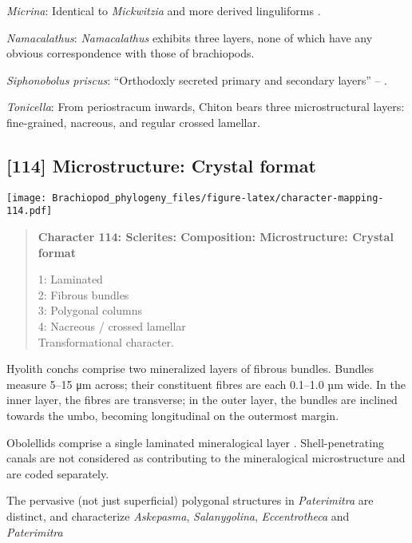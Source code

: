 \documentclass[openany]{book}
\theoremstyle{definition}
\theoremstyle{definition}
\theoremstyle{definition}
\theoremstyle{remark}
\begin{document}
\hypertarget{Micrina-coding-113}{}
\emph{Micrina}: Identical to \emph{Mickwitzia} and more derived
linguliforms \citep{Holmer2011Firstrecord}.

\hypertarget{Namacalathus-coding-113}{}
\emph{Namacalathus}: \emph{Namacalathus} exhibits three layers, none of
which have any obvious correspondence with those of brachiopods.

\hypertarget{Siphonobolus_priscus-coding-113}{}
\emph{Siphonobolus priscus}: ``Orthodoxly secreted primary and secondary
layers'' -- \citet{Williams2004Chemicostructure}.

\hypertarget{Tonicella-coding-113}{}
\emph{Tonicella}: From periostracum inwards, Chiton bears three
microstructural layers: fine-grained, nacreous, and regular crossed
lamellar.

\subsection*{{[}114{]} Microstructure: Crystal
format}\label{microstructure-crystal-format}

\texttt{[image: Brachiopod\_phylogeny\_files/figure-latex/character-mapping-114.pdf]}

\begin{quote}
\textbf{Character 114: Sclerites: Composition: Microstructure: Crystal
format}

1: Laminated\\
2: Fibrous bundles\\
3: Polygonal columns\\
4: Nacreous / crossed lamellar\\
Transformational character.
\end{quote}

Hyolith conchs comprise two mineralized layers of fibrous bundles.
Bundles measure 5--15 μm across; their constituent fibres are each
0.1--1.0 µm wide. In the inner layer, the fibres are transverse; in the
outer layer, the bundles are inclined towards the umbo, becoming
longitudinal on the outermost margin.

Obolellids comprise a single laminated mineralogical layer
\citep{Balthasar2008iMummpikia}. Shell-penetrating canals are not
considered as contributing to the mineralogical microstructure and are
coded separately.

The pervasive (not just superficial) polygonal structures in
\emph{Paterimitra} are distinct, and characterize \emph{Askepasma},
\emph{Salanygolina}, \emph{Eccentrotheca} and \emph{Paterimitra}
\citep{Larsson2014iPaterimitra}
\end{document}
